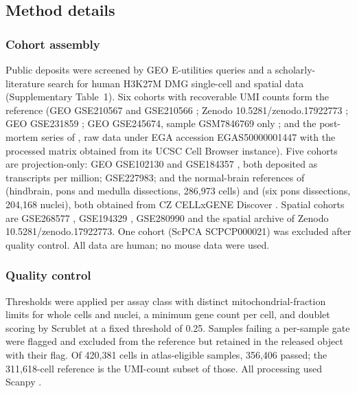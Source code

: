 \documentclass[12pt,a4paper]{article}
\begin{document}
\subsection{Method details}

\subsubsection{Cohort assembly}

Public deposits were screened by GEO E-utilities queries and a scholarly-literature search for human H3K27M DMG
single-cell and spatial data (Supplementary Table~1). Six cohorts with recoverable UMI counts form the reference (GEO
GSE210567 and GSE210566 \citep{jessa2022km}; Zenodo 10.5281/zenodo.17922773 \citep{collot2026igsfvista}; GEO GSE231859
\citep{desisto2024tumor}; GEO GSE245674, sample GSM7846769 only \citep{zang2024singlecell}; and the post-mortem series
of \citet{okada2026singlenucleus}, raw data under EGA accession EGAS50000001447 with the processed matrix obtained from
its UCSC Cell Browser instance). Five cohorts are projection-only: GEO GSE102130 \citep{filbin2018developmental} and
GSE184357 \citep{liu2022landscape}, both deposited as transcripts per million; GSE227983; and the normal-brain
references of \citet{braun2023comprehensive} (hindbrain, pons and medulla dissections, 286,973 cells) and
\citet{siletti2023transcriptomic} (six pons dissections, 204,168 nuclei), both obtained from CZ CELLxGENE Discover
\citep{abdulla2025czcellxgene}. Spatial cohorts are GSE268577 \citep{huchede2024bmp}, GSE194329 \citep{ren2023spatial}, GSE280990
and the spatial archive of Zenodo 10.5281/zenodo.17922773. One cohort (ScPCA SCPCP000021) was excluded after quality
control. All data are human; no mouse data were used.

\subsubsection{Quality control}

Thresholds were applied per assay class with distinct mitochondrial-fraction limits for whole cells and nuclei, a
minimum gene count per cell, and doublet scoring by Scrublet \citep{wolock2019scrublet} at a fixed threshold of 0.25.
Samples failing a per-sample gate were flagged and excluded from the reference but retained in the released object with
their flag. Of 420,381 cells in atlas-eligible samples, 356,406 passed; the 311,618-cell reference is the UMI-count
subset of those. All processing used Scanpy \citep{wolf2018scanpy}.
\end{document}
